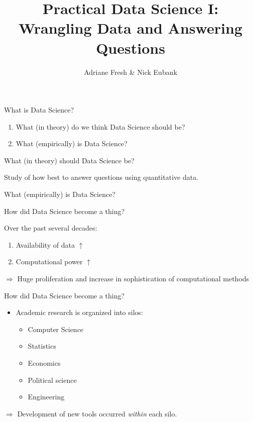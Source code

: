 \documentclass[11pt]{beamer}
\title{Practical Data Science I: \\ Wrangling Data and Answering Questions}
\author{\small Adriane Fresh \& Nick Eubank}
\date{\vspace*{.3in} \date}
\begin{document}
\begin{frame}
\maketitle
\end{frame}


\begin{frame}[c]{What is Data Science?}
\begin{enumerate}
	\pause \item What (\alert{in theory}) do we think Data Science should be?
	\pause \item What (\alert{empirically}) is Data Science?
\end{enumerate}
\end{frame}


\begin{frame}[c]{What (in theory) should Data Science be?}

\pause Study of how best to \alert{answer questions} using \alert{quantitative data.}

\end{frame}

\begin{frame}[c]{What (empirically) is Data Science?}

\end{frame}

\begin{frame}[c]{How did Data Science become a thing?}

Over the past several decades:
\begin{enumerate}
	\item Availability of data $\uparrow$
	\item Computational power $\uparrow$
\end{enumerate}
\pause
$\Rightarrow$ Huge proliferation and increase in sophistication of computational methods
\end{frame}


\begin{frame}[c]{How did Data Science become a thing?}

\begin{itemize}
	\item Academic research is organized into silos:
	\pause
	\begin{itemize}
		\item Computer Science
		\item Statistics
		\item Economics
		\item Political science
		\item Engineering
	\end{itemize}
\end{itemize}
\pause $\Rightarrow$ Development of new tools occurred \emph{within} each silo.
\end{frame}
\end{document}
